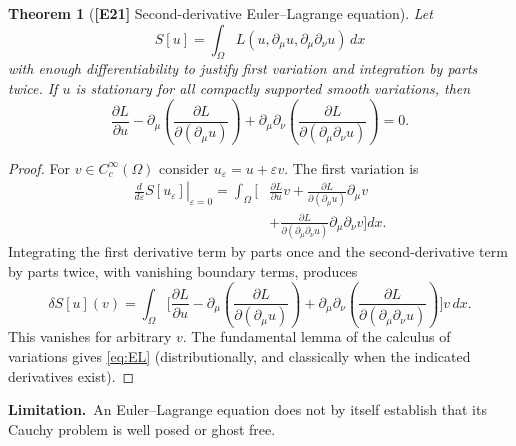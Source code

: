 \documentclass[11pt,letterpaper]{article}
\newtheorem{theorem}{Theorem}[section]
\theoremstyle{definition}
\theoremstyle{remark}
\newcommand{\id}[1]{\textnormal{\textbf{[#1]}}}
\newcommand{\scope}{\par\smallskip\noindent\textbf{Limitation.}\ }
\begin{document}
\begin{theorem}[\id{E21} Second-derivative Euler--Lagrange equation]\label{thm:EL}
Let
\begin{equation*}
S[u]=\int_\Omega L(u,\partial_\mu u,\partial_\mu\partial_\nu u)\,dx
\end{equation*}
with enough differentiability to justify first variation and
integration by parts twice. If $u$ is stationary for all compactly
supported smooth variations, then
\begin{equation}\label{eq:EL}
\boxed{\frac{\partial L}{\partial u}
-\partial_\mu\!\left(\frac{\partial L}{\partial(\partial_\mu u)}\right)
+\partial_\mu\partial_\nu\!\left(
\frac{\partial L}{\partial(\partial_\mu\partial_\nu u)}\right)=0}.
\end{equation}
\end{theorem}
\begin{proof}
For $v\in C_c^\infty(\Omega)$ consider $u_\varepsilon=u+\varepsilon v$.
The first variation is
\begin{align*}
\left.\frac d{d\varepsilon}S[u_\varepsilon]\right|_{\varepsilon=0}
=\int_\Omega\bigg[
&\frac{\partial L}{\partial u}v
+\frac{\partial L}{\partial(\partial_\mu u)}\partial_\mu v\\
&+\frac{\partial L}{\partial(\partial_\mu\partial_\nu u)}
\partial_\mu\partial_\nu v\bigg]dx.
\end{align*}
Integrating the first derivative term by parts once and the
second-derivative term by parts twice, with vanishing boundary terms,
produces
\begin{equation*}
\delta S[u](v)=\int_\Omega\bigg[
\frac{\partial L}{\partial u}
-\partial_\mu\!\left(\frac{\partial L}{\partial(\partial_\mu u)}\right)
+\partial_\mu\partial_\nu\!\left(
\frac{\partial L}{\partial(\partial_\mu\partial_\nu u)}\right)
\bigg]v\,dx.
\end{equation*}
This vanishes for arbitrary $v$. The fundamental lemma of the calculus
of variations gives \eqref{eq:EL} (distributionally, and classically
when the indicated derivatives exist).
\end{proof}
\scope An Euler--Lagrange equation does not by itself establish that its
Cauchy problem is well posed or ghost free.
\end{document}
